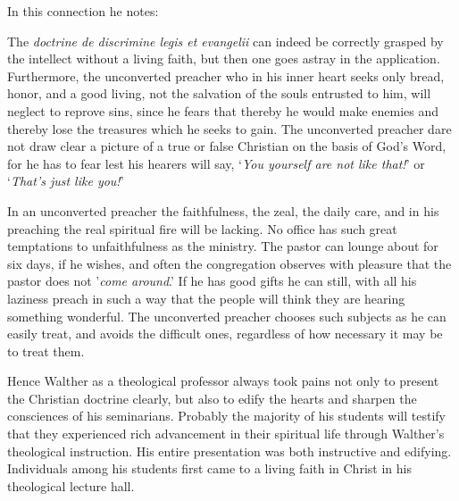 In this connection he notes:   \begin{fancyquotes}The \textit{doctrine de discrimine legis et evangelii} can indeed be correctly grasped by the intellect without a living faith, but then one goes astray in the application. Furthermore, the unconverted preacher who in his inner heart seeks only bread, honor, and a good living, not the salvation of the souls entrusted to him, will neglect to reprove sins, since he fears that thereby he would make enemies and thereby lose the treasures which he seeks to gain. The unconverted preacher dare not draw clear a picture of a true or false Christian on the basis of God's Word, for he has to fear lest his hearers will say, `\textit{You yourself are not like that!}' or `\textit{That's just like you!}'\par In an unconverted preacher the faithfulness, the zeal, the daily care, and in his preaching the real spiritual fire will be lacking. No office has such great temptations to unfaithfulness as the ministry. The pastor can lounge about for six days, if he wishes, and often the congregation observes with pleasure that the pastor does not '\textit{come around}.' If he has good gifts he can still, with all his laziness preach in such a way that the people will think they are hearing something wonderful. The unconverted preacher chooses such subjects as he can easily treat, and avoids the difficult ones, regardless of how necessary it may be to treat them.\end{fancyquotes} 

Hence Walther as a theological professor always took pains not only to present the Christian doctrine clearly, but also to edify the hearts and sharpen the consciences of his seminarians. Probably the majority of his students will testify that they experienced rich advancement in their spiritual life through Walther's theological instruction. His entire presentation was both instructive and edifying. Individuals among his students first came to a living faith in Christ in his theological lecture hall.

